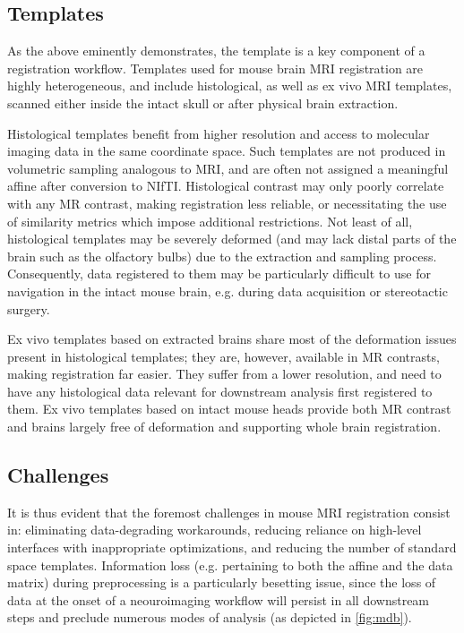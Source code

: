 \subsection{Templates}
As the above eminently demonstrates, the template is a key component of a registration workflow.
Templates used for mouse brain MRI registration are highly heterogeneous, and include histological, as well as ex vivo MRI templates, scanned either inside the intact skull or after physical brain extraction.

Histological templates benefit from higher resolution and access to molecular imaging data in the same coordinate space.
Such templates are not produced in volumetric sampling analogous to MRI, and are often not assigned a meaningful affine after conversion to NIfTI.
Histological contrast may only poorly correlate with any MR contrast, making registration less reliable, or necessitating the use of similarity metrics which impose additional restrictions.
Not least of all, histological templates may be severely deformed (and may lack distal parts of the brain such as the olfactory bulbs) due to the extraction and sampling process.
Consequently, data registered to them may be particularly difficult to use for navigation in the intact mouse brain, e.g. during data acquisition or stereotactic surgery.

Ex vivo templates based on extracted brains share most of the deformation issues present in histological templates;
they are, however, available in MR contrasts, making registration far easier.
They suffer from a lower resolution, and need to have any histological data relevant for downstream analysis first registered to them.
Ex vivo templates based on intact mouse heads provide both MR contrast and brains largely free of deformation and supporting whole brain registration.

\subsection{Challenges}
It is thus evident that the foremost challenges in mouse MRI registration consist in: eliminating data-degrading workarounds, reducing reliance on high-level interfaces with inappropriate optimizations, and reducing the number of standard space templates.
Information loss (e.g. pertaining to both the affine and the data matrix) during preprocessing is a particularly besetting issue, since the loss of data at the onset of a neouroimaging workflow will persist in all downstream steps and preclude numerous modes of analysis (as depicted in \cref{fig:mdb}).
